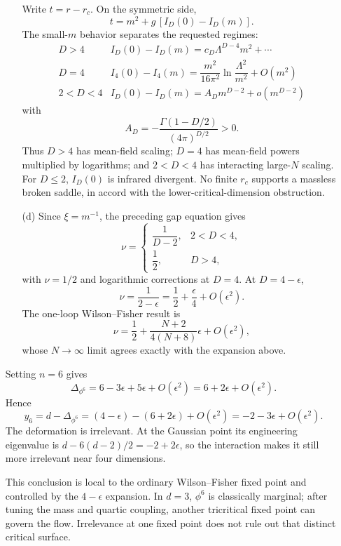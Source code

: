 \begin{enumerate}
\begin{enumerate}
    Write \(t=r-r_c\).  On the symmetric side,
    \[
      t=m^2+g\,[I_D(0)-I_D(m)].
    \]
    The small-\(m\) behavior separates the requested regimes:
    \[
    \begin{array}{c|c}
      D>4&
      I_D(0)-I_D(m)=c_D\Lambda^{D-4}m^2+\cdots\\
      D=4&
      I_4(0)-I_4(m)=
        \dfrac{m^2}{16\pi^2}\ln\dfrac{\Lambda^2}{m^2}
        +O(m^2)\\[6pt]
      2<D<4&
      I_D(0)-I_D(m)=
        A_Dm^{D-2}+o(m^{D-2})
    \end{array}
    \]
    with
    \[
      A_D=-\frac{\Gamma(1-D/2)}{(4\pi)^{D/2}}>0 .
    \]
    Thus \(D>4\) has mean-field scaling; \(D=4\) has mean-field powers
    multiplied by logarithms; and \(2<D<4\) has interacting large-\(N\)
    scaling.  For \(D\le2\), \(I_D(0)\) is infrared divergent.  No finite
    \(r_c\) supports a massless broken saddle, in accord with the
    lower-critical-dimension obstruction.
    \item[(d)]
    Since \(\xi=m^{-1}\), the preceding gap equation gives
    \[
      \boxed{\nu=
      \begin{cases}
        \dfrac1{D-2},&2<D<4,\\[4pt]
        \dfrac12,&D>4,
      \end{cases}}
    \]
    with \(\nu=1/2\) and logarithmic corrections at \(D=4\).
    At \(D=4-\epsilon\),
    \[
      \nu=\frac1{2-\epsilon}
        =\frac12+\frac{\epsilon}{4}+O(\epsilon^2).
    \]
    The one-loop Wilson--Fisher result is
    \[
      \nu=\frac12+
        \frac{N+2}{4(N+8)}\epsilon+O(\epsilon^2),
    \]
    whose \(N\to\infty\) limit agrees exactly with the expansion above.
  \end{enumerate}

  Setting \(n=6\) gives
  \[
    \Delta_{\phi^6}=6-3\epsilon+5\epsilon+O(\epsilon^2)
      =6+2\epsilon+O(\epsilon^2).
  \]
  Hence
  \[
    y_6=d-\Delta_{\phi^6}
      =(4-\epsilon)-(6+2\epsilon)+O(\epsilon^2)
      =-2-3\epsilon+O(\epsilon^2).
  \]
  The deformation is irrelevant.  At the Gaussian point its engineering
  eigenvalue is \(d-6(d-2)/2=-2+2\epsilon\), so the interaction makes it
  still more irrelevant near four dimensions.

  This conclusion is local to the ordinary Wilson--Fisher fixed point and
  controlled by the \(4-\epsilon\) expansion.  In \(d=3\), \(\phi^6\) is
  classically marginal; after tuning the mass and quartic coupling, another
  tricritical fixed point can govern the flow.  Irrelevance at one fixed
  point does not rule out that distinct critical surface.


\end{enumerate}

